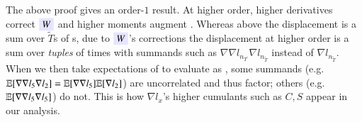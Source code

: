     The above proof gives an order-$1$ result.  %
At higher order, higher derivatives correct
${\translucent{moosky}{$W$}}$
and higher
moments augment
.
%
%
Whereas above the displacement is a sum over $\tilde T$s of
s, due to ${\translucent{moosky}{$W$}}$'s
corrections the displacement at higher order is a sum over \emph{tuples} of
times with summands such as $\nabla\nabla l_{n_{T^\prime}} \nabla l_{n_{\tilde
T}}$ instead of $\nabla l_{n_{\tilde T}}$.
%
When we then take expectations of  to evaluate 
 as  
,
some summands (e.g.\ $\mathbb{E}[\nabla\nabla l_{5}
\nabla l_{2}]=\mathbb{E}[\nabla\nabla l_{5}]
\mathbb{E}[\nabla l_{2}]$) are uncorrelated and thus factor; others (e.g.\ $\mathbb{E}[\nabla\nabla
l_{5} \nabla l_{5}]$) do not.  This is how $\nabla l_x$'s higher cumulants such
as $C, S$ appear in our analysis.
%
    \label{sect:diagrams-in-brief}



